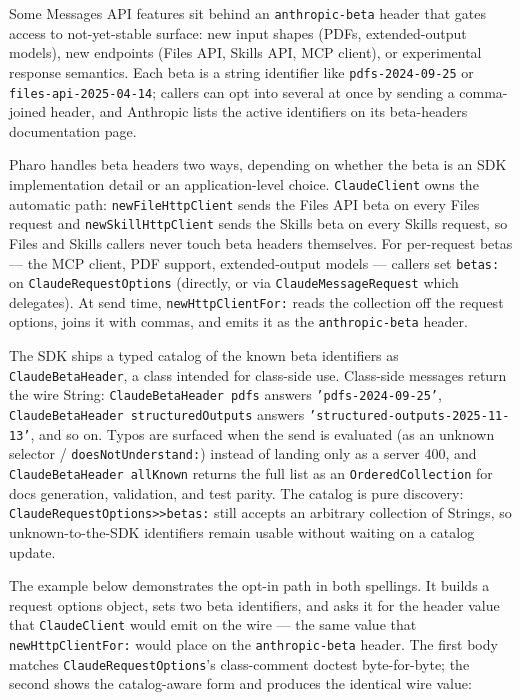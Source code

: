 \documentclass[a4paper,10pt,fleqn]{article}
\begin{document}
Some Messages API features sit behind an \texttt{anthropic-beta}
header that gates access to not-yet-stable surface: new input shapes
(PDFs, extended-output models), new endpoints (Files API, Skills API,
MCP client), or experimental response semantics.  Each beta is a
string identifier like \texttt{pdfs-2024-09-25} or
\texttt{files-api-2025-04-14}; callers can opt into several at once
by sending a comma-joined header, and Anthropic lists the active
identifiers on its beta-headers documentation page.

Pharo handles beta headers two ways, depending on whether the beta
is an SDK implementation detail or an application-level choice.
\texttt{ClaudeClient} owns the automatic path: \texttt{newFileHttpClient}
sends the Files API beta on every Files request and
\texttt{newSkillHttpClient} sends the Skills beta on every Skills
request, so Files and Skills callers never touch beta headers
themselves.  For per-request betas --- the MCP client, PDF support,
extended-output models --- callers set \texttt{betas:} on
\texttt{ClaudeRequestOptions} (directly, or via
\texttt{ClaudeMessageRequest} which delegates).  At send time,
\texttt{newHttpClientFor:} reads the collection off the request
options, joins it with commas, and emits it as the
\texttt{anthropic-beta} header.

\begin{sloppypar}
The SDK ships a typed catalog of the known beta identifiers as
\texttt{ClaudeBetaHeader}, a class intended for class-side use.
Class-side messages return the wire String:
\texttt{ClaudeBetaHeader pdfs} answers
\texttt{'pdfs-2024-09-25'},
\texttt{ClaudeBetaHeader structuredOutputs} answers
\texttt{'structured-outputs-2025-11-13'}, and so on.  Typos are
surfaced when the send is evaluated (as an unknown selector /
\texttt{doesNotUnderstand:}) instead of landing only as a server
400, and \texttt{ClaudeBetaHeader allKnown} returns
the full list as an \texttt{OrderedCollection} for docs generation,
validation, and test parity.  The catalog is pure discovery:
\texttt{ClaudeRequestOptions>>betas:} still accepts an arbitrary
collection of Strings, so unknown-to-the-SDK identifiers remain
usable without waiting on a catalog update.
\end{sloppypar}

The example below demonstrates the opt-in path in both spellings.
It builds a request options object, sets two beta identifiers, and
asks it for the header value that \texttt{ClaudeClient} would emit
on the wire --- the same value that \texttt{newHttpClientFor:}
would place on the \texttt{anthropic-beta} header.  The first body
matches \texttt{ClaudeRequestOptions}'s class-comment doctest
byte-for-byte; the second shows the catalog-aware form and
produces the identical wire value:
\end{document}
